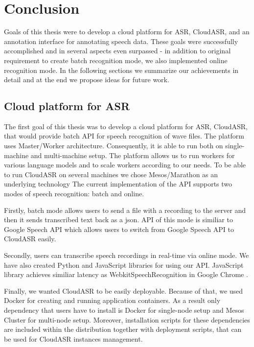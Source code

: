 \chapter*{Conclusion}

Goals of this thesis were to develop a cloud platform for ASR, CloudASR,
  and an annotation interface for annotating speech data.
These goals were successfully accomplished and in several aspects even surpassed
  - in addition to original requirement to create batch recognition mode,
  we also implemented online recognition mode.
In the following sections we summarize our achievements in detail and
  at the end we propose ideas for future work.

\section*{Cloud platform for ASR}
The first goal of this thesis was to develop a cloud platform for ASR, CloudASR,
  that would provide batch API for speech recognition of wave files.
The platform uses Master/Worker architecture.
Consequently, it is able to run both on single-machine and multi-machine setup.
The platform allows us to run workers for various language models and to scale workers according to our needs.
To be able to run CloudASR on several machines we chose Mesos/Marathon as an underlying technology
The current implementation of the API supports two modes of speech recognition: batch and online.

Firstly, batch mode allows users to send a file with a recording to the server
  and then it sends transcribed text back as a json.
API of this mode is similiar to Google Speech API
  which allows users to switch from Google Speech API to CloudASR easily.

Secondly, users can transcribe speech recordings in real-time via online mode.
We have also created Python and JavaScript libraries for using our API.
JavaScript library achieves similiar latency as WebkitSpeechRecognition in Google Chrome .


Finally, we wanted CloudASR to be easily deployable.
Because of that, we used Docker for creating and running application containers.
As a result only dependency that users have to install is Docker for single-node setup and Mesos Cluster for multi-node setup.
Moreover, installation scripts for these dependencies are included within the distribution together with deployment scripts,
  that can be used for CloudASR instances management.

